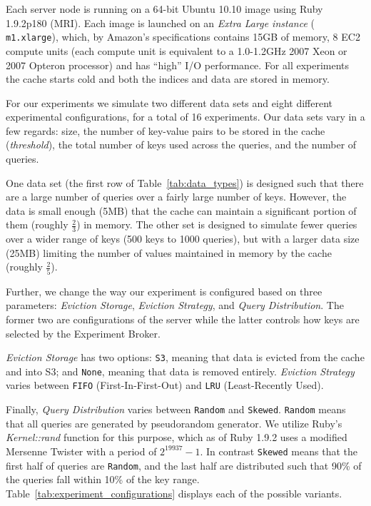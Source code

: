 Each server node is running on a 64-bit Ubuntu 10.10 image using Ruby 1.9.2p180
(MRI). Each image is launched on an \emph{Extra Large instance} ({\tt
m1.xlarge}), which, by Amazon's specifications contains 15GB of memory, 8 EC2
compute units (each compute unit is equivalent to a 1.0-1.2GHz 2007 Xeon or
2007 Opteron processor) and has ``high'' I/O performance. For all experiments
the cache starts cold and both the indices and data are stored in memory.

For our experiments we simulate two different data sets and eight different
experimental configurations, for a total of 16 experiments. Our data sets vary
in a few regards: size, the number of key-value pairs to be stored in the cache
(\emph{threshold}), the total number of keys used across the queries, and the
number of queries.

One data set (the first row of Table~\ref{tab:data_types}) is designed such
that there are a large number of queries over a fairly large number of keys.
However, the data is small enough (5MB) that the cache can maintain a
significant portion of them (roughly $\frac{2}{3}$) in memory. The other set is
designed to simulate fewer queries over a wider range of keys (500 keys to 1000
queries), but with a larger data size (25MB) limiting the number of values
maintained in memory by the cache (roughly $\frac{2}{5}$).

Further, we change the way our experiment is configured based on three
parameters: \emph{Eviction Storage}, \emph{Eviction Strategy}, and \emph{Query
Distribution}. The former two are configurations of the server while the latter
controls how keys are selected by the Experiment Broker.

\emph{Eviction Storage} has two options: {\tt S3}, meaning that data is evicted
from the cache and into S3; and {\tt None}, meaning that data is removed
entirely. \emph{Eviction Strategy} varies between {\tt FIFO}
(First-In-First-Out) and {\tt LRU} (Least-Recently Used). 

Finally, \emph{Query Distribution} varies between {\tt Random} and {\tt Skewed}.
{\tt Random} means that all queries are generated by pseudorandom generator.
We utilize Ruby's \emph{Kernel::rand} function for this purpose, which as of
Ruby 1.9.2 uses a modified Mersenne Twister with a period of
$2^{19937}-1$\cite{ruby_rand}. In contrast {\tt Skewed} means that the first
half of queries are {\tt Random}, and the last half are distributed such that
90\% of the queries fall within 10\% of the key range.
Table~\ref{tab:experiment_configurations} displays each of the possible
variants.

